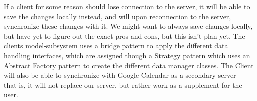 If a client for some reason should lose connection to the server, it will be able to save the changes locally instead, and will upon reconnection to the server, synchronize these changes with it. We might want to always save changes locally, but have yet to figure out the exact pros and cons, but this isn't plan yet. The clients model-subsystem uses a bridge pattern to apply the different data handling interfaces, which are assigned though a Strategy pattern which uses an Abstract Factory pattern to create the different data manager classes. The Client will also be able to synchronize with Google Calendar as a secondary server - that is, it will not replace our server, but rather work as a supplement for the user. 
